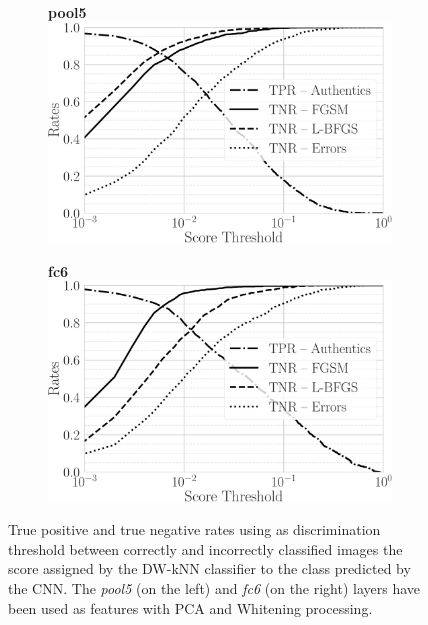 \begin{figure}
\centering
%
\begin{subfigure}[t]{0.5\linewidth}
\centering
\textbf{pool5}\\
\includegraphics[width=\linewidth]{rates-pool5}%
\label{fig:adv:tpfn-dist-pool5}
\end{subfigure}%
%
\begin{subfigure}[t]{0.5\linewidth}
\centering
\textbf{fc6}\\
\includegraphics[width=\linewidth]{rates-fc6}%
\label{fig:adv:tpfn-dist-fc6}
\end{subfigure}%
\caption{True positive and true negative rates using as discrimination threshold between correctly and incorrectly classified images the score assigned by the DW-kNN classifier to the class predicted by the CNN.
The \emph{pool5} (on the left) and \emph{fc6} (on the right) layers have been used as features with PCA and Whitening processing.}
\label{fig:adv:tptn-distribs}
\end{figure}

